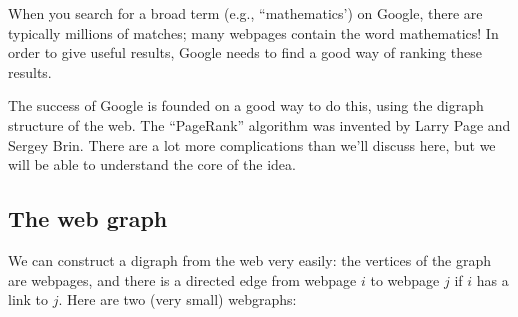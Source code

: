 \documentclass[11pt]{article}
\begin{document}



When you search for a broad term (e.g., ``mathematics') on Google, there are typically millions of matches; many webpages contain the word mathematics! In order to give useful results, Google needs to find a good way of ranking these results.

The success of Google is founded on a good way to do this, using the digraph structure of the web. The ``PageRank'' algorithm was invented by Larry Page and Sergey Brin. There are a lot more complications than we'll discuss here, but we will be able to understand the core of the idea.

\subsection*{The web graph}

We can construct a digraph from the web very easily: the vertices of the graph are webpages, and there is a directed edge from webpage $i$ to webpage $j$ if $i$ has a link to $j$. Here are two (very small) webgraphs:

\begin{center}
\hspace{5cm}
\end{center}
\end{document}
